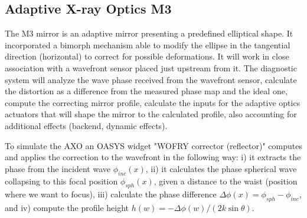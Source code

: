 \documentclass{iucr}              %
\begin{document}
\subsection{Adaptive X-ray Optics M3}

The M3 mirror is an adaptive mirror presenting a predefined elliptical shape. It incorporated a bimorph mechanism able to modify the ellipse in the tangential direction (horizontal) to correct for possible deformations. It will work in close association with a wavefront sensor placed just upstream from it. The diagnostic system will analyze the wave phase received from the wavefront sensor, calculate the distortion as a difference from the measured phase map and the ideal one, compute the correcting mirror profile, calculate the inputs for the adaptive optics actuators that will shape the mirror to the calculated profile, also accounting for additional effects (backend, dynamic effects).

To simulate the AXO an OASYS widget "WOFRY corrector (reflector)" computes and applies the correction to the wavefront in the following way: i) it extracts the phase from the incident wave $\phi_{inc}(x)$, ii)  it calculates the phase spherical wave collapsing to this focal position $\phi_{sph}(x)$, given a distance to the waist (position where we want to focus), iii) calculate the phase difference $\Delta \phi(x) = \phi_{sph} - \phi_{inc}$, and iv) compute the profile height $h(w) = -\Delta \phi(w) / (2 k \sin \theta)$.
\end{document}
